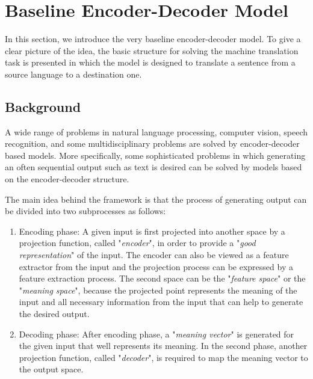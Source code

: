 \documentclass[preprint, 12pt]{elsarticle}
\begin{document}
	\section{Baseline Encoder-Decoder Model}
	In this section, we introduce the very baseline encoder-decoder model. To give a clear picture of the idea, the basic structure for solving the machine translation task is presented in which the model is designed to translate a sentence from a source language to a destination one.  
		\subsection{Background}
		A wide range of problems in natural language processing, computer vision, speech recognition, and some multidisciplinary problems are solved by encoder-decoder based models. More specifically, some sophisticated problems in which generating an often sequential output such as text is desired can be solved by models based on the encoder-decoder structure. 
		
		The main idea behind the framework is that the process of generating output can be divided into two subprocesses as follows:
		\begin{enumerate}
			\item Encoding phase: A given input is first projected into another space by a projection function, called "\textit{encoder}", in order to provide a "\textit{good representation}" of the input. The encoder can also be viewed as a feature extractor from the input and the projection process can be expressed by a feature extraction process. The second space can be the "\textit{feature space}" or the "\textit{meaning space}", because the projected point represents the meaning of the input and all necessary information from the input that can help to generate the desired output.
			\item Decoding phase: After encoding phase, a "\textit{meaning vector}" is generated for the given input that well represents its meaning. In the second phase, another projection function, called "\textit{decoder}", is required to map the meaning vector to the output space.
		\end{enumerate} 
	
\end{document}
